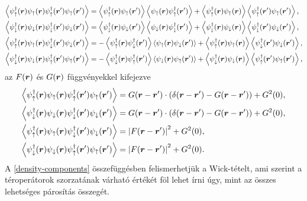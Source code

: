 \documentclass[a4paper,12pt,titlepage]{article}
\newcommand{\RR}{{\vb*{r}}}
\begin{document}
\begin{equation}
\begin{split} \label{density-components}
	\expval{\psi_\uparrow^\dagger(\RR) \psi_\uparrow(\RR) \psi_\uparrow^\dagger(\RR^\prime) \psi_\uparrow(\RR^\prime)} & = \expval{\psi_\uparrow^\dagger(\RR) \psi_\uparrow(\RR^\prime)} \expval{\psi_\uparrow(\RR) \psi_\uparrow^\dagger(\RR^\prime)} + \expval{\psi_\uparrow^\dagger(\RR) \psi_\uparrow(\RR)} \expval{\psi_\uparrow^\dagger(\RR^\prime) \psi_\uparrow(\RR^\prime)},  \\
	\expval{\psi_\downarrow^\dagger(\RR) \psi_\downarrow(\RR) \psi_\downarrow^\dagger(\RR^\prime) \psi_\downarrow(\RR^\prime)} & = \expval{\psi_\downarrow^\dagger(\RR) \psi_\downarrow(\RR^\prime)} \expval{\psi_\downarrow(\RR) \psi_\downarrow^\dagger(\RR^\prime)} + \expval{\psi_\downarrow^\dagger(\RR) \psi_\downarrow(\RR)} \expval{\psi_\downarrow^\dagger(\RR^\prime) \psi_\downarrow(\RR^\prime)},  \\
	\expval{\psi_\uparrow^\dagger(\RR) \psi_\uparrow(\RR) \psi_\downarrow^\dagger(\RR^\prime) \psi_\downarrow(\RR^\prime)} & = -\expval{\psi_\uparrow^\dagger(\RR) \psi_\downarrow^\dagger(\RR^\prime)} \expval{\psi_\uparrow(\RR) \psi_\downarrow(\RR^\prime)} + \expval{\psi_\uparrow^\dagger(\RR) \psi_\uparrow(\RR)} \expval{\psi_\downarrow^\dagger(\RR^\prime) \psi_\downarrow(\RR^\prime)},  \\
	\expval{\psi_\downarrow^\dagger(\RR) \psi_\downarrow(\RR) \psi_\uparrow^\dagger(\RR^\prime) \psi_\uparrow(\RR^\prime)} & = -\expval{\psi_\downarrow^\dagger(\RR) \psi_\uparrow^\dagger(\RR^\prime)} \expval{\psi_\downarrow(\RR) \psi_\uparrow(\RR^\prime)} + \expval{\psi_\downarrow^\dagger(\RR) \psi_\downarrow(\RR)} \expval{\psi_\uparrow^\dagger(\RR^\prime) \psi_\uparrow(\RR^\prime)},
\end{split}
\end{equation}
az $F(\RR)$ és $G(\RR)$ függvényekkel kifejezve
\begin{equation} \label{correlators-F-G}
\begin{split}
	\expval{\psi_\uparrow^\dagger(\RR) \psi_\uparrow(\RR) \psi_\uparrow^\dagger(\RR^\prime) \psi_\uparrow(\RR^\prime)} & = G(\RR - \RR^\prime) \cdot \left( \delta(\RR - \RR^\prime) - G(\RR - \RR^\prime) \right) + G^2(0), \\
	\expval{\psi_\downarrow^\dagger(\RR) \psi_\downarrow(\RR) \psi_\downarrow^\dagger(\RR^\prime) \psi_\downarrow(\RR^\prime)} & = G(\RR - \RR^\prime) \cdot \left( \delta(\RR - \RR^\prime) - G(\RR - \RR^\prime) \right) + G^2(0), \\
	\expval{\psi_\uparrow^\dagger(\RR) \psi_\uparrow(\RR) \psi_\downarrow^\dagger(\RR^\prime) \psi_\downarrow(\RR^\prime)} & = \left| F(\RR - \RR^\prime) \right|^2 + G^2(0), \\
	\expval{\psi_\downarrow^\dagger(\RR) \psi_\downarrow(\RR) \psi_\uparrow^\dagger(\RR^\prime) \psi_\uparrow(\RR^\prime)} & = \left| F(\RR - \RR^\prime) \right|^2 + G^2(0).
\end{split}
\end{equation}
A \eqref{density-components} összefüggésben felismerhetjük a Wick-tételt, ami szerint a téroperátorok szorzatának várható értékét föl lehet írni úgy, mint az összes lehetséges párosítás összegét.
\end{document}
